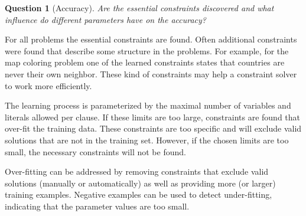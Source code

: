 \documentclass[letterpaper]{article}
\newtheorem{question}{Question}
\theoremstyle{definition}
\begin{document}
\begin{question}[Accuracy]
  Are the essential constraints discovered and what influence do different parameters have on the accuracy?
\end{question}
For all problems the essential constraints are found.
Often additional constraints were found that describe some structure in the problems.
For example, for the map coloring problem one of the learned constraints states that countries are never their own neighbor.
These kind of constraints may help a constraint solver to work more efficiently.

The learning process is parameterized by the maximal number of variables and literals allowed per clause.
If these limits are too large, constraints are found that over-fit the training data.
These constraints are too specific and will exclude valid solutions that are not in the training set.
However, if the chosen limits are too small, the necessary constraints will not be found.

Over-fitting can be addressed by removing constraints that exclude valid solutions (manually or automatically) as well as providing more (or larger) training examples.
Negative examples can be used to detect under-fitting, indicating that the parameter values are too small.
\end{document}
